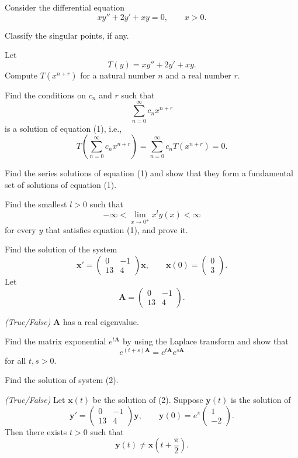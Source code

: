 \begin{problem}
Consider the differential equation
\[
xy''+2y'+xy=0,
\qquad x>0. \tag{1}
\]
\begin{problemsubparts}
\item Classify the singular points, if any.
\item Let
\[
T(y)=xy''+2y'+xy.
\]
Compute $T(x^{n+r})$ for a natural number $n$ and a real number $r$.
\item Find the conditions on $c_n$ and $r$ such that
\[
\sum_{n=0}^{\infty}c_nx^{n+r}
\]
is a solution of equation (1), i.e.,
\[
T\left(\sum_{n=0}^{\infty}c_nx^{n+r}\right)
=\sum_{n=0}^{\infty}c_nT(x^{n+r})=0.
\]
\item Find the series solutions of equation (1) and show that they form a fundamental set of solutions of equation (1).
\item Find the smallest $l>0$ such that
\[
-\infty<\lim_{x\to0^+}x^ly(x)<\infty
\]
for every $y$ that satisfies equation (1), and prove it.
\end{problemsubparts}
\end{problem}

\begin{problem}
Find the solution of the system
\[
\mathbf x'=
\begin{pmatrix}
0&-1\\
13&4
\end{pmatrix}\mathbf x,
\qquad
\mathbf x(0)=
\begin{pmatrix}
0\\
3
\end{pmatrix}. \tag{2}
\]
Let
\[
\mathbf A=
\begin{pmatrix}
0&-1\\
13&4
\end{pmatrix}.
\]
\begin{problemsubparts}
\item \textit{(True/False)} $\mathbf A$ has a real eigenvalue.
\item Find the matrix exponential $e^{t\mathbf A}$ by using the Laplace transform and show that
\[
e^{(t+s)\mathbf A}=e^{t\mathbf A}e^{s\mathbf A}
\]
for all $t,s>0$.
\item Find the solution of system (2).
\item \textit{(True/False)} Let $\mathbf x(t)$ be the solution of (2). Suppose $\mathbf y(t)$ is the solution of
\[
\mathbf y'=
\begin{pmatrix}
0&-1\\
13&4
\end{pmatrix}\mathbf y,
\qquad
\mathbf y(0)=e^{\pi}
\begin{pmatrix}
1\\
-2
\end{pmatrix}.
\]
Then there exists $t>0$ such that
\[
\mathbf y(t)\ne\mathbf x\left(t+\frac{\pi}{2}\right).
\]
\end{problemsubparts}
\end{problem}


